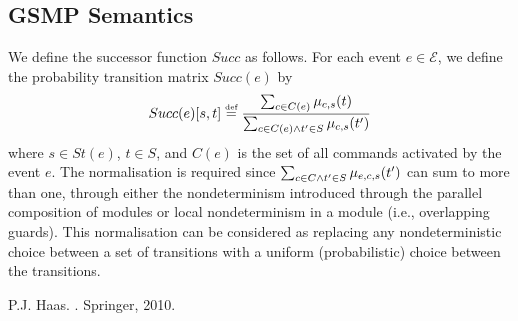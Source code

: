 \documentclass{article}
\newcommand{\eqdef}{\ensuremath{\stackrel{\text{\tiny def}}{=}}}
\renewcommand{\_}{\underline{~}}
\newcommand{\suc}{Succ}
\begin{document}
\subsection*{GSMP Semantics}
We define the successor function $\suc$ as follows.
For each event $e \in \mathcal{E}$, we define the probability transition matrix $\suc(e)$ by
\[\suc(e)[s,t] \eqdef \frac{\sum_{c \in C(e)} \mu_{c,s}(t)}{\sum_{c \in C(e) \\ \wedge t'\in S} \mu_{c,s}(t')} \]
where $s\in St(e)$, $t \in S$, and $C(e)$ is the set of all commands activated by the event $e$.
The normalisation is required since $\sum_{c \in C \\ \wedge t'\in S} \mu_{e,c,s}(t')$ can sum to more than one, through either the nondeterminism introduced through the parallel composition of modules or local nondeterminism in a module (i.e., overlapping guards). 
This normalisation can be considered as replacing any nondeterministic choice between a set of transitions with a uniform (probabilistic) choice between the transitions.



%
%
%
%
%


\begin{thebibliography}{1}
P.J. Haas.
.
\newblock Springer, 2010.
\end{thebibliography}
\end{document}
